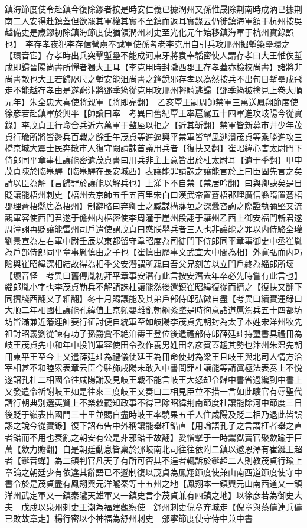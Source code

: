 鎮海節度使令赴鎮今復除鏐者按是時安仁義已據潤州又孫惟晟除荆南時成汭已據荆南二人安得赴鎮蓋但欲罷其軍權其實不至鎮而返耳實錄云仍徙鎮海軍額于杭州按吳越備史是歲鏐初除鎮海節度使猶領潤州刺史至光化元年始移鎮海軍于杭州實錄誤也】　李存孝夜犯李存信營虜奉誠軍使孫考老李克用自引兵攻邢州掘塹築壘環之【環音宦】存孝時出兵突擊塹壘不能成河東牙將袁奉韜密使人謂存孝曰大王惟俟塹成即歸晉陽尚書所憚者獨大王耳【李克用時封隴西郡王存孝蓋亦檢校尚書】諸將非尚書敵也大王若歸咫尺之塹安能沮尚書之鋒銳邪存孝以為然按兵不出旬日塹壘成飛走不能越存孝由是遂窮汴將鄧季筠從克用攻邢州輕騎逃歸【鄧季筠被擒見上卷大順元年】朱全忠大喜使將親軍【將即亮翻】　乙亥覃王嗣周帥禁軍三萬送鳳翔節度使徐彦若赴鎮軍於興平【帥讀曰率　考異曰舊紀覃王率扈駕五十四軍進攻岐陽今從實錄】李茂貞王行瑜合兵近六萬軍于盩厔以拒之【近其靳翻】禁軍皆新募市井少年茂貞行瑜所將皆邊兵百戰之餘壬午茂貞等進逼興平禁軍皆望風逃潰茂貞等乘勝進攻三橋京城大震士民奔散市人復守闕請誅首議用兵者【復扶又翻】崔昭緯心害太尉門下侍郎同平章事杜讓能密遺茂貞書曰用兵非主上意皆出於杜太尉耳【遺于季翻】甲申茂貞陳於臨皋驛【臨皋驛在長安城西】表讓能罪請誅之讓能言於上曰臣固先言之矣請以臣為解【言歸罪於讓能以解兵也】上涕下不自禁【禁居吟翻】曰與卿訣矣是日貶讓能梧州刺史【梧州去京師五千五百里宋白曰漢武帝置蒼梧郡理廣信縣隋置蒼梧郡理蒼梧縣唐為梧州】制辭略曰弃卿士之臧謀構藩垣之深釁咨詢之際證執彌堅又流觀軍容使西門君遂于儋州内樞密使李周潼于崖州段詡于驩州乙酉上御安福門斬君遂周潼詡再貶讓能雷州司戶遣使謂茂貞曰惑朕舉兵者三人也非讓能之罪以内侍駱全瓘劉景宣為左右軍中尉壬辰以東都留守韋昭度為司徒門下侍郎同平章事御史中丞崔胤為戶部侍郎同平章事胤慎由之子也【崔慎由歷事文武宣大中間為相】外寛弘而内巧險與崔昭緯深相結故得為相季父安潛謂所親曰吾父兄刻苦以立門戶終為緇郎所壞【壞音怪　考異曰舊傳胤初拜平章事安潛有此言按安潛去年卒必先時嘗有此言也】緇郎胤小字也李茂貞勒兵不解請誅杜讓能然後還鎮崔昭緯復從而擠之【復扶又翻下同擠牋西翻又子細翻】冬十月賜讓能及其弟戶部侍郎弘徽自盡【考異曰續實運錄曰大順二年相國杜讓能孔緯值上京頻嬰離亂朝綱紊墜是時徇意諸道扈駕兵五十四都坊坊皆滿兼近藩連帥要行征討便自統軍至如岐陽李茂貞先朝封為太子本姓宋洋州牧先祖討昭義劉從諫有功子孫爵賞不絶洎夀王登位後遣禮部侍郎薛廷珪持璽書具禮冊為岐王茂貞先中和年中投判軍容使田令孜作養男姓田名彦賓蓋趨其勢也汴州朱温先朝冊東平王至今上又遣薛廷珪為禮儀使延王為冊命使封為梁王且岐王與北司人情方洽宰相甚不和睦累表章云臣今駐斾咸陽未敢入中書問罪杜讓能等請寘極法表奏上不悦遂詔孔杜二相國令往咸陽謝及見岐王戰不能言岐王大怒却令歸中書省過纔到中書上又發遣令祈謝岐王如是往來三度岐王又奏曰二相見臣並不措一言如此曠官有辱聖代請行朝典别選英賢上不樂敕罷知政事不得已除昭緯荆南節度杜讓能除河中節度三日後貶于嶺表出國門三十里並賜自盡時岐王率驍果五千人住咸陽及貶二相乃退此皆誤謬之說今從實錄】復下詔布告中外稱讓能舉枉錯直【用論語孔子之言謂枉者舉之直者錯而不用也衰亂之朝安有公是非邪錯千故翻】愛憎擊于一時鬻獄賣官聚歛踰于巨萬【歛力贍翻】自是朝廷動息皆稟於邠岐南北司往往依附二鎮以邀恩澤有崔鋋王超者【鋋音蟬】為二鎮判官凡天子有所可否其不逞者輒訴於鋋超二人則教茂貞行瑜上章論之朝廷少有依違其辭語已不遜制復以茂貞為鳳翔節度使兼山南西道節度使守中書令於是茂貞盡有鳳翔興元洋隴秦等十五州之地【鳳翔本一鎮興元山南西道又一鎮洋州武定軍又一鎮秦隴天雄軍又一鎮史言李茂貞兼有四鎮之地】以徐彦若為御史大夫　戊戍以泉州刺史王潮為福建觀察使　舒州刺史倪章弃城走【倪章與蔡儔連兵儔已敗故章走】楊行密以李神福為舒州刺史　邠寧節度使守侍中兼中書